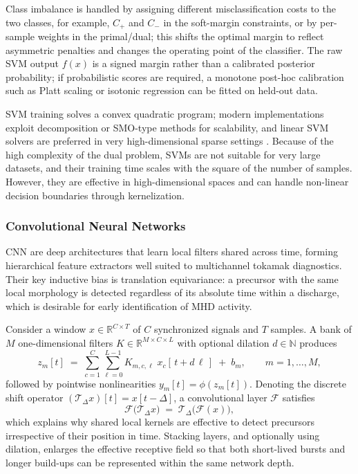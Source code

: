 Class imbalance is handled by assigning different misclassification costs to the two classes, for example, $C_+$ and $C_-$ in the soft-margin constraints, or by per-sample weights in the primal/dual; this shifts the optimal margin to reflect asymmetric penalties and changes the operating point of the classifier. The raw SVM output $f(x)$ is a signed margin rather than a calibrated posterior probability; if probabilistic scores are required, a monotone post-hoc calibration such as Platt scaling or isotonic regression can be fitted on held-out data.

SVM training solves a convex quadratic program; modern implementations exploit decomposition or SMO-type methods for scalability, and linear SVM solvers are preferred in very high-dimensional sparse settings \autocite{cortesSupportvectorNetworks1995b,scholkopfLearningKernelsSupport2001}. Because of the high complexity of the dual problem, \ac{SVM}s are not suitable for very large datasets, and their training time scales with the square of the number of samples. However, they are effective in high-dimensional spaces and can handle non-linear decision boundaries through kernelization.



\subsubsection{Convolutional Neural Networks}\label{sec:cnn}

\ac{CNN} are deep architectures that learn local filters shared across time, forming hierarchical feature extractors well suited to multichannel tokamak diagnostics. Their key inductive bias is translation equivariance: a precursor with the same local morphology is detected regardless of its absolute time within a discharge, which is desirable for early identification of \ac{MHD} activity.

Consider a window $x \in \mathbb{R}^{C \times T}$ of $C$ synchronized signals and $T$ samples. A bank of $M$ one-dimensional filters $K \in \mathbb{R}^{M \times C \times L}$ with optional dilation $d \in \mathbb{N}$ produces
\begin{equation}
z_{m}[t] \;=\; \sum_{c=1}^{C}\sum_{\ell=0}^{L-1} K_{m,c,\ell}\; x_{c}[\,t + d\,\ell\,] \;+\; b_{m},
\qquad m=1,\dots,M,
\label{eq:conv1d}
\end{equation}
followed by pointwise nonlinearities $y_m[t]=\phi(z_m[t])$. Denoting the discrete shift operator $(\mathcal{T}_\Delta x)[t]=x[t-\Delta]$, a convolutional layer $\mathcal{F}$ satisfies
\begin{equation}
\mathcal{F}\!\big(\mathcal{T}_\Delta x\big)\;=\;\mathcal{T}_\Delta\!\big(\mathcal{F}(x)\big),
\label{eq:equivariance}
\end{equation}
which explains why shared local kernels are effective to detect precursors irrespective of their position in time. Stacking layers, and optionally using dilation, enlarges the effective receptive field so that both short-lived bursts and longer build-ups can be represented within the same network depth.

